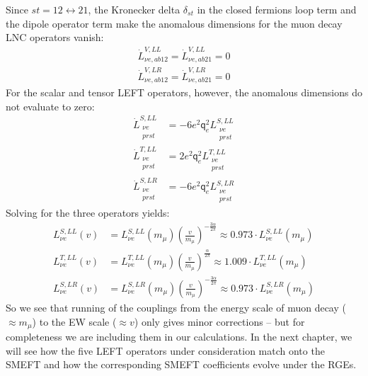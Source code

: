 Since $st=12\leftrightarrow 21$, the Kronecker delta $\delta_{st}$ in the closed fermions loop term and the dipole operator term make the anomalous dimensions for the muon decay LNC operators vanish:
\begin{align}
    \dot{L}^{V,LL}_{\nu e, ab12} = \dot{L}^{V,LL}_{\nu e, ab21}=0 \\[5pt]
    \dot{L}^{V,LR}_{\nu e, ab12} = \dot{L}^{V,LR}_{\nu e, ab21}=0
\end{align}
For the scalar and tensor LEFT operators, however, the anomalous dimensions do not evaluate to zero:
\begin{align}
    \dot{L}^{S,LL}_{\substack{\nu e \\ prst}} &= -6 e^2 \mathsf{q}_e^2 L^{S,LL}_{\substack{\nu e \\ prst}}\\[5pt]
    \dot{L}^{T,LL}_{\substack{\nu e \\ prst}} &= 2 e^2 \mathsf{q}_e^2 L^{T,LL}_{\substack{\nu e \\ prst}}\\[5pt]
    \dot{L}^{S,LR}_{\substack{\nu e \\ prst}} &= -6 e^2 \mathsf{q}_e^2 L^{S,LR}_{\substack{\nu e \\ prst}}
\end{align}
Solving for the three operators yields:
\begin{align}
    L^{S,LL}_{\nu e}(v) &= L^{S,LL}_{\nu e}(m_\mu)\left(\frac{v}{m_\mu}\right)^{-\frac{3\alpha}{2\pi}}\approx0.973\cdot L^{S,LL}_{\nu e}(m_\mu)\\
    L^{T,LL}_{\nu e}(v) &= L^{T,LL}_{\nu e}(m_\mu)\left(\frac{v}{m_\mu}\right)^{\frac{\alpha}{2\pi}}\approx 1.009\cdot L^{T,LL}_{\nu e}(m_\mu)\\
    L^{S,LR}_{\nu e}(v) &= L^{S,LR}_{\nu e}(m_\mu)\left(\frac{v}{m_\mu}\right)^{-\frac{3\alpha}{2\pi}}\approx 0.973\cdot L^{S,LR}_{\nu e}(m_\mu)
\end{align}
So we see that running of the couplings from the energy scale of muon decay ($\approx m_\mu$) to the EW scale ($\approx v$) only gives minor corrections -- but for completeness we are including them in our calculations. In the next chapter, we will see how the five LEFT operators under consideration match onto the SMEFT and how the corresponding SMEFT coefficients evolve under the RGEs.
